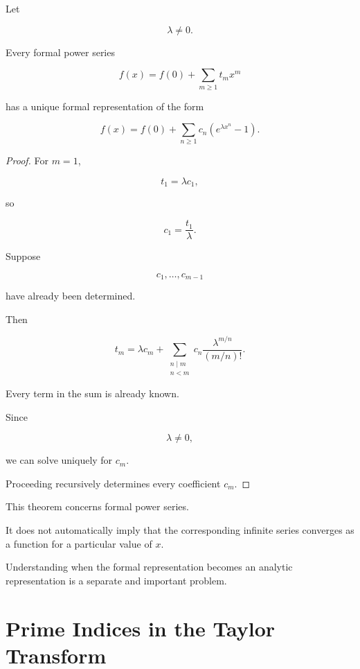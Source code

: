 \begin{theorem}

Let

\[
\lambda\neq0.
\]

Every formal power series

\[
f(x)
=
f(0)+\sum_{m\geq1}t_mx^m
\]

has a unique formal representation of the form

\[
\boxed{
f(x)
=
f(0)
+
\sum_{n\geq1}
c_n
\left(
e^{\lambda x^n}-1
\right).
}
\]

\end{theorem}

\begin{proof}

For \(m=1\),

\[
t_1=\lambda c_1,
\]

so

\[
c_1=\frac{t_1}{\lambda}.
\]

Suppose

\[
c_1,\ldots,c_{m-1}
\]

have already been determined.

Then

\[
t_m
=
\lambda c_m
+
\sum_{\substack{n\mid m\\n<m}}
c_n
\frac{\lambda^{m/n}}{(m/n)!}.
\]

Every term in the sum is already known.

Since

\[
\lambda\neq0,
\]

we can solve uniquely for \(c_m\).

Proceeding recursively determines every coefficient \(c_m\).

\end{proof}

\begin{remark}

This theorem concerns formal power series.

It does not automatically imply that the corresponding infinite
series converges as a function for a particular value of \(x\).

Understanding when the formal representation becomes an analytic
representation is a separate and important problem.

\end{remark}

\section{Prime Indices in the Taylor Transform}

